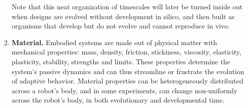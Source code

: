 \begin{enumerate}
    Note that this neat organization of timescales will
    later be turned inside out when designs are evolved without development in silico, and then built as organisms that develop but do not evolve and cannot reproduce in vivo.
    
    \item \textbf{Material.} Embodied systems are made out of physical matter
    with mechanical properties: 
    mass, density, friction,
    stickiness,
    viscosity,
    elasticity, plasticity,
    stability,
    strengths and limits.
    These 
    properties determine the system's passive dynamics and can thus streamline or frustrate the evolution of adaptive behavior.
    Material properties can be heterogeneously distributed across a robot's body, and in some experiments, 
    can change non-uniformly across the robot's body, in both evolutionary and developmental time.
    

\end{enumerate}
